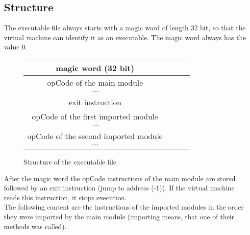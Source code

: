 \subsection{Structure}
\label{linker:executable:structure}
The executable file always starts with a magic word of length 32 bit, so that the
virtual machine can identify it as an executable. The magic word always has the value 0.
\\ \begin{figure}[h]
		
	\begin{center}
		\begin{tabular}{|c|c|c|c|}
			\hline
				magic word (32 bit) \\
			\hline
				opCode of the main module \\	
			\hline
				$\cdots$ \\
			\hline
				exit instruction \\
			\hline
			opCode of the first imported module \\	
			\hline
				$\cdots$ \\
			\hline
			opCode of the second imported module \\	
			\hline
				$\cdots$ \\
			\hline
		\end{tabular}
	\end{center}
	
	\caption{Structure of the executable file}
	\label{linker:executable:structure:figure}
\end{figure}
After the magic word the opCode instructions of the main module are stored
followed by an exit instruction (jump to address (-1)). If the virtual machine
reads this instruction, it stops execution. \\
The following content are the instructions of the imported modules in the order
they were imported by the main module (importing means, that one of their
methods was called).
